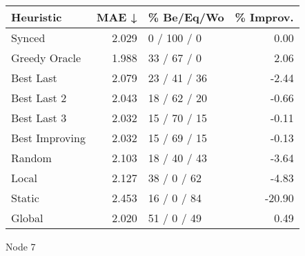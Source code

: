 \begin{tabular}{lrlr}
\toprule
\textbf{Heuristic} & \textbf{MAE ↓} & \textbf{\% Be/Eq/Wo} & \textbf{\% Improv.} \\
\midrule
            Synced &          2.029 &          0 / 100 / 0 &                0.00 \\
     Greedy Oracle &          1.988 &          33 / 67 / 0 &                2.06 \\
         Best Last &          2.079 &         23 / 41 / 36 &               -2.44 \\
       Best Last 2 &          2.043 &         18 / 62 / 20 &               -0.66 \\
       Best Last 3 &          2.032 &         15 / 70 / 15 &               -0.11 \\
    Best Improving &          2.032 &         15 / 69 / 15 &               -0.13 \\
            Random &          2.103 &         18 / 40 / 43 &               -3.64 \\
             Local &          2.127 &          38 / 0 / 62 &               -4.83 \\
            Static &          2.453 &          16 / 0 / 84 &              -20.90 \\
            Global &          2.020 &          51 / 0 / 49 &                0.49 \\
\bottomrule
\end{tabular}
\caption{Node 7}
\label{tab:hr_non_lr05_le1_bs4_7}
